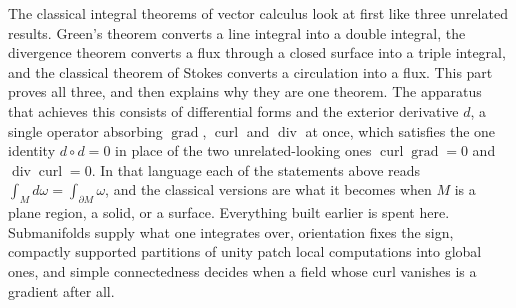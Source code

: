 \documentclass{report}
\theoremstyle{purplethm}
\theoremstyle{purplethm}
\theoremstyle{defthm}
\theoremstyle{examplethm}
\theoremstyle{questionthm}
\theoremstyle{remarkthm}
\theoremstyle{asidethm}
\theoremstyle{importantremarkthm}
\theoremstyle{remarkthm}
\theoremstyle{ainotethm}
\theoremstyle{purplethm}
\DeclareMathOperator{\divg}{div}
\DeclareMathOperator{\curl}{curl}
\DeclareMathOperator{\grad}{grad}
\begin{document}
The classical integral theorems of vector calculus look at first like three unrelated results.
Green's theorem converts a line integral into a double integral, the divergence theorem converts a
flux through a closed surface into a triple integral, and the classical theorem of Stokes converts
a circulation into a flux. This part proves all three, and then explains why they are one theorem.
The apparatus that achieves this consists of differential forms and the exterior derivative $d$,
a single operator absorbing $\grad$, $\curl$ and $\divg$ at once, which satisfies the one identity
$d \circ d = 0$ in place of the two unrelated-looking ones $\curl\grad = 0$ and $\divg\curl = 0$.
In that language each of the statements above reads $\int_M d\omega = \int_{\partial M}\omega$,
and the classical versions are what it becomes when $M$ is a plane region, a solid, or a surface.
Everything built earlier is spent here. Submanifolds supply what one integrates over, orientation
fixes the sign, compactly supported partitions of unity patch local computations into global ones,
and simple connectedness decides when a field whose curl vanishes is a gradient after all.







\appendix




\end{document}
